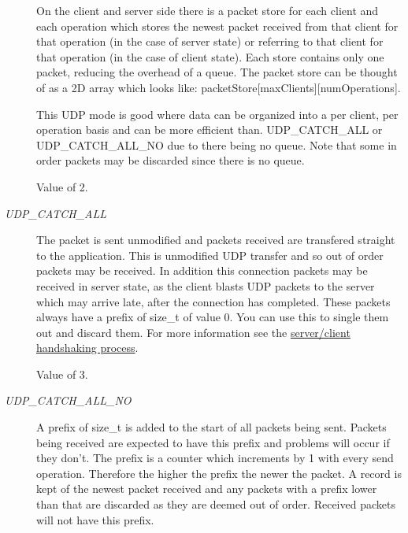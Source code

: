 \begin{Desc}
\begin{description}
\begin{DoxyItemize}
\end{DoxyItemize}

On the client and server side there is a packet store for each client and each operation which stores the newest packet received from that client for that operation (in the case of server state) or referring to that client for that operation (in the case of client state). Each store contains only one packet, reducing the overhead of a queue. The packet store can be thought of as a 2D array which looks like: packetStore\mbox{[}maxClients\mbox{]}\mbox{[}numOperations\mbox{]}.\par
\par


This UDP mode is good where data can be organized into a per client, per operation basis and can be more efficient than. UDP\_\-CATCH\_\-ALL or UDP\_\-CATCH\_\-ALL\_\-NO due to there being no queue. Note that some in order packets may be discarded since there is no queue.\par
\par


Value of 2. \item[{\em 
\hypertarget{class_net_mode_a43cfa55ee6a4db66a8d7d6c27f766964a158ce5f833cde150d209f480936b2b0a}{
UDP\_\-CATCH\_\-ALL}
\label{class_net_mode_a43cfa55ee6a4db66a8d7d6c27f766964a158ce5f833cde150d209f480936b2b0a}
}]The packet is sent unmodified and packets received are transfered straight to the application. This is unmodified UDP transfer and so out of order packets may be received. In addition this connection packets may be received in server state, as the client blasts UDP packets to the server which may arrive late, after the connection has completed. These packets always have a prefix of size\_\-t of value 0. You can use this to single them out and discard them. For more information see the \hyperlink{handshake_page}{server/client handshaking process}.\par
\par


Value of 3. \item[{\em 
\hypertarget{class_net_mode_a43cfa55ee6a4db66a8d7d6c27f766964ad4582c7d9e25f9fbd2cec99e4455386f}{
UDP\_\-CATCH\_\-ALL\_\-NO}
\label{class_net_mode_a43cfa55ee6a4db66a8d7d6c27f766964ad4582c7d9e25f9fbd2cec99e4455386f}
}]A prefix of size\_\-t is added to the start of all packets being sent. Packets being received are expected to have this prefix and problems will occur if they don't. The prefix is a counter which increments by 1 with every send operation. Therefore the higher the prefix the newer the packet. A record is kept of the newest packet received and any packets with a prefix lower than that are discarded as they are deemed out of order. Received packets will not have this prefix. \par
\par



\end{description}
\end{Desc}
